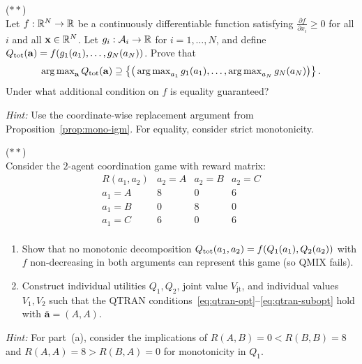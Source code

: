 \documentclass[11pt,a4paper]{article}
\begin{document}
\begin{exercise}
\textnormal{(\(**\))} \\
Let $f : \mathbb{R}^N \to \mathbb{R}$ be a continuously differentiable function
satisfying $\frac{\partial f}{\partial x_i} \geq 0$ for all $i$
and all $\mathbf{x} \in \mathbb{R}^N$.  Let $g_i : \mathcal{A}_i \to \mathbb{R}$
for $i = 1, \ldots, N$, and define
$Q_{\mathrm{tot}}(\mathbf{a}) = f(g_1(a_1), \ldots, g_N(a_N))$.  Prove that
\[
  \operatorname{arg\,max}_{\mathbf{a}} Q_{\mathrm{tot}}(\mathbf{a})
  \supseteq \left\{
    \big(\operatorname{arg\,max}_{a_1} g_1(a_1), \ldots,
    \operatorname{arg\,max}_{a_N} g_N(a_N)\big)
  \right\}.
\]
Under what additional condition on $f$ is equality guaranteed?

\textit{Hint:} Use the coordinate-wise replacement argument from
Proposition~\ref{prop:mono-igm}.  For equality, consider strict
monotonicity.
\end{exercise}

\begin{exercise}
\textnormal{(\(**\))} \\
Consider the $2$-agent coordination game with reward matrix:
\[
\begin{array}{c|ccc}
  R(a_1, a_2) & a_2 = A & a_2 = B & a_2 = C \\
  \hline
  a_1 = A & 8 & 0 & 6 \\
  a_1 = B & 0 & 8 & 0 \\
  a_1 = C & 6 & 0 & 6 \\
\end{array}
\]
\begin{enumerate}[label=(\alph*)]
  \item Show that no monotonic decomposition $Q_{\mathrm{tot}}(a_1, a_2) =
    f(Q_1(a_1), Q_2(a_2))$ with $f$ non-decreasing in both
    arguments can represent this game (so QMIX fails).
  \item Construct individual utilities $Q_1, Q_2$, joint value
    $V_{\mathrm{jt}}$, and individual values $V_1, V_2$ such
    that the QTRAN conditions~\eqref{eq:qtran-opt}--\eqref{eq:qtran-subopt}
    hold with $\bar{\mathbf{a}} = (A, A)$.
\end{enumerate}

\textit{Hint:} For part~(a), consider the implications of
$R(A, B) = 0 < R(B, B) = 8$ and $R(A, A) = 8 > R(B, A) = 0$
for monotonicity in $Q_1$.
\end{exercise}
\end{document}
